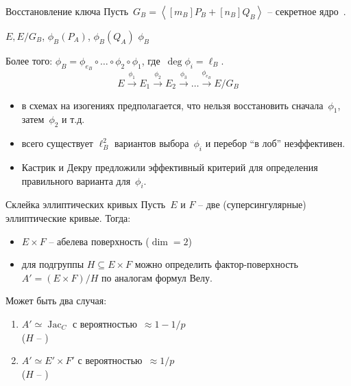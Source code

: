 \documentclass{beamer}
\begin{document}
\begin{frame}{Восстановление ключа}
	Пусть~$G_B = \left<[m_B] P_B + [n_B] Q_B \right>$ -- секретное ядро~\UserB.
	
	\vspace*{1em}
	
	\begin{center}
		$E, E/G_B$, $\phi_B(P_A)$, $\phi_B(Q_A)$ \structure{$\Longrightarrow$} $\phi_B$
	\end{center}
	Более того:
	$\phi_B = \phi_{e_B} \circ \ldots \circ \phi_2 \circ \phi_1$, где~$\deg\phi_i = \ell_B$.
	\[
	E \xrightarrow{\phi_1} E_1  \xrightarrow{\phi_2} E_2 \xrightarrow{\phi_3} \ldots \xrightarrow{\phi_{e_B}} E/G_B
	\]
	
	\begin{itemize}
		\item в схемах на изогениях предполагается, что нельзя восстановить сначала~$\phi_1$, затем~$\phi_2$ и т.д.
		\item всего существует $\ell_B^2$ вариантов выбора~$\phi_i$ и перебор ``в лоб'' неэффективен.
		\item Кастрик и Декру предложили эффективный критерий для определения правильного варианта для~$\phi_i$.
	\end{itemize}
\end{frame}

\begin{frame}{Склейка эллиптических кривых}
	Пусть~$E$ и $F$ -- две (суперсингулярные) эллиптические кривые. Тогда:
	\begin{itemize}
		\item $E \times F$ -- абелева поверхность ($\dim = 2$)
		\item для подгруппы $H \subseteq E \times F$ можно определить фактор-поверхность~$A' = (E \times F)/H$ по аналогам формул Велу.
	\end{itemize}
	
	Может быть два случая:
	\begin{enumerate}
		\item $A' \simeq \operatorname{Jac}_C$ с вероятностью~$\approx 1 - 1/p$\\($H$ -- )
		\item $A' \simeq E' \times F'$ с вероятностью~$\approx 1/p$ \\ ($H$ -- )
	\end{enumerate}
\end{frame}
\end{document}
